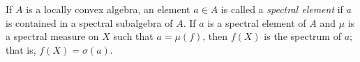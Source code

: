 If $A$ is a locally convex algebra, an element $a \in A$ is called a \emph{spectral element} if $a$ is contained in a spectral subalgebra of $A$. If $a$ is a spectral element of $A$ and $\mu$ is a spectral measure on $X$ such that $a = \mu(f)$, then $f(X)$ is the spectrum of $a$; that is, $f(X) = \sigma(a)$.
